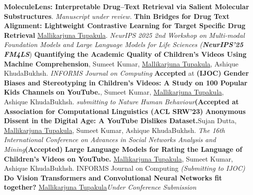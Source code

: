 %
%
%


\begin{projects}
	\publication
    {\textbf{MoleculeLens: Interpretable Drug--Text Retrieval via Salient Molecular Substructures}. \textit{Manuscript under review.}}
	\publication
    {\textbf{Thin Bridges for Drug Text Alignment: Lightweight Contrastive Learning for Target Specific Drug Retrieval} \underline{Mallikarjuna Tupakula}. \textit{NeurIPS 2025 2nd Workshop on Multi-modal Foundation Models and Large Language Models for Life Sciences (\textbf{NeurIPS'25 FM4LS}})} 
    \publication
    {\textbf{Quantifying the Academic Quality of Children’s Videos Using Machine Comprehension},  Sumeet Kumar, \underline{Mallikarjuna Tupakula}, Ashique KhudaBukhsh. \textit{INFORMS Journal on Computing} \textbf{Accepted} at \textbf{(IJOC)}}
    \publication
    {\textbf{Gender Biases and Stereotyping in Children’s Videos: A Study on 100 Popular Kids Channels on YouTube.}, Sumeet Kumar, \underline{Mallikarjuna Tupakula}, Ashique KhudaBukhsh. \textit{submitting to Nature Human Behaviour}\textbf{(Accepted at Association for Computational Linguistics \textbf{(ACL SRW’23)}}}
    \publication
    {\textbf{Anonymous Dissent in the Digital Age: A YouTube Dislikes Dataset.}Sujan Dutta, \underline{Mallikarjuna Tupakula}, Sumeet Kumar, Ashique KhudaBukhsh. \textit{The 16th International Conference on Advances in Social Networks Analysis and Mining}\textbf{(Accepted)}}
    \publication
    {\textbf{Large Language Models for Rating the Language of Children’s Videos on YouTube.} \underline{Mallikarjuna Tupakula}, Sumeet Kumar, Ashique KhudaBukhsh. INFORMS Journal on Computing \textit{(Submitting to IJOC)}}
    \publication
    {\textbf{Do Vision Transformers and Convolutional Neural Networks fit together?} \underline{Mallikarjuna Tupakula}\textit{Under Conference Submission}} 
\end{projects}

